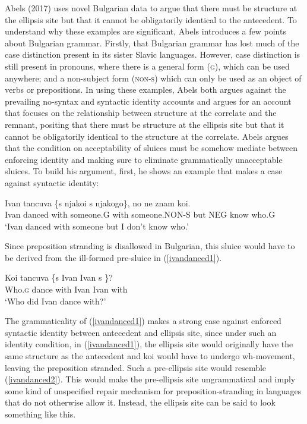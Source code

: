 \documentclass{turabian-researchpaper}
\begin{document}
Abels (2017) uses novel Bulgarian data to argue that there must be structure at the ellipsis site but that it cannot be obligatorily identical to the antecedent. To understand why these examples are significant, Abels introduces a few points about Bulgarian grammar. Firstly, that Bulgarian grammar has lost much of the case distinction present in its sister Slavic languages. However, case distinction is still present in pronouns, where there is a general form (\textsc{g}), which can be used anywhere; and a non-subject form (\textsc{non-s}) which can only be used as an object of verbs or prepositions. In using these examples, Abels both argues against the prevailing no-syntax and syntactic identity accounts and argues for an account that focuses on the relationship between structure at the correlate and the remnant, positing that there must be structure at the ellipsis site but that it cannot be obligatorily identical to the structure at the correlate. Abels argues that the condition on acceptability of sluices must be somehow mediate between enforcing identity and making sure to eliminate grammatically unacceptable sluices. 
To build his argument, first, he shows an example that makes a case against syntactic identity: 
\begin{exe}
\ex\label{ivandanced1}
\gll Ivan tancuva \{s njakoi \textbar s njakogo\}, no ne znam koi. \\
Ivan danced with someone.G with someone.NON-S but NEG know who.G \\
\trans `Ivan danced with someone but I don't know who.'
\end{exe}

Since preposition stranding is disallowed in Bulgarian, this sluice would have to be derived from the ill-formed pre-sluice in (\ref{ivandanced1}).

\begin{exe}
\ex\label{ivandanced2}
\gll *Koi tancuva \{s \underline{\hspace{1cm}} Ivan \textbar Ivan s \underline{\hspace{1cm}} \}? \\
Who.\textsc{g} dance with \hspace{1cm} Ivan Ivan with \\
\trans `Who did Ivan dance with?'
\end{exe}

The grammaticality of (\ref{ivandanced1}) makes a strong case against enforced syntactic identity between antecedent and ellipsis site, since under such an identity condition, in (\ref{ivandanced1}), the ellipsis site would originally have the same structure as the antecedent and koi would have to undergo wh-movement, leaving the preposition stranded. Such a pre-ellipsis site would resemble (\ref{ivandanced2}). This would make the pre-ellipsis site ungrammatical and imply some kind of unspecified repair mechanism for preposition-stranding in languages that do not otherwise allow it. Instead, the ellipsis site can be said to look something like this. 
\end{document}
